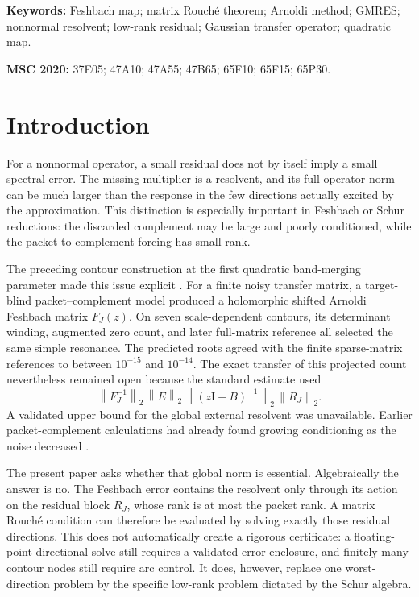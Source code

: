 \documentclass[11pt]{article}
\theoremstyle{definition}
\theoremstyle{remark}
\newcommand{\Id}{\mathrm I}
\newcommand{\norm}[1]{\left\lVert#1\right\rVert}
\begin{document}
\noindent\textbf{Keywords:} Feshbach map; matrix Rouch\'e theorem; Arnoldi
method; GMRES; nonnormal resolvent; low-rank residual; Gaussian transfer
operator; quadratic map.

\medskip
\noindent\textbf{MSC 2020:} 37E05; 47A10; 47A55; 47B65; 65F10; 65F15;
65P30.

\section{Introduction}
\label{sec:introduction}

For a nonnormal operator, a small residual does not by itself imply a small
spectral error.  The missing multiplier is a resolvent, and its full
operator norm can be much larger than the response in the few directions
actually excited by the approximation.  This distinction is especially
important in Feshbach or Schur reductions: the discarded complement may be
large and poorly conditioned, while the packet-to-complement forcing has
small rank.

The preceding contour construction at the first quadratic band-merging
parameter made this issue explicit \citep{WangContourFeshbach2026}.  For a
finite noisy transfer matrix, a target-blind packet--complement model
produced a holomorphic shifted Arnoldi Feshbach matrix \(F_J(z)\).  On seven
scale-dependent contours, its determinant winding, augmented zero count,
and later full-matrix reference all selected the same simple resonance.
The predicted roots agreed with the finite sparse-matrix references to
between \(10^{-15}\) and \(10^{-14}\).  The exact transfer of this
projected count nevertheless remained open because the standard estimate
used
\[
 \norm{F_J^{-1}}_2\,\norm{E}_2\,
 \norm{(z\Id-B)^{-1}}_2\,\norm{R_J}_2.
\]
A validated upper bound for the global external resolvent was unavailable.
Earlier packet-complement calculations had already found growing
conditioning as the noise decreased \citep{WangPhysicalFeshbach2026}.

The present paper asks whether that global norm is essential.  Algebraically
the answer is no.  The Feshbach error contains the resolvent only through
its action on the residual block \(R_J\), whose rank is at most the packet
rank.  A matrix Rouch\'e condition can therefore be evaluated by solving
exactly those residual directions.  This does not automatically create a
rigorous certificate: a floating-point directional solve still requires a
validated error enclosure, and finitely many contour nodes still require
arc control.  It does, however, replace one worst-direction problem by the
specific low-rank problem dictated by the Schur algebra.
\end{document}
